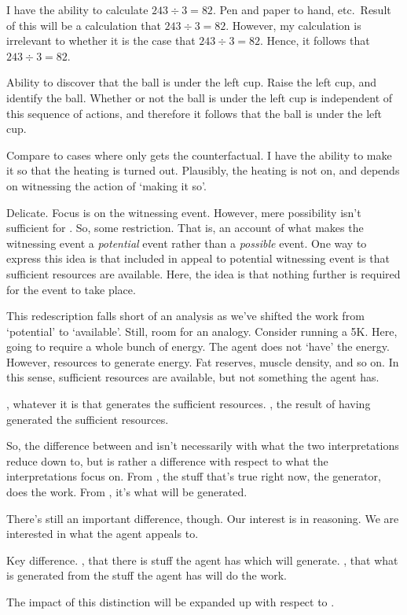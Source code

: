\begin{note}[\WR{} def.]
  \begin{illustration}
    I have the ability to calculate \(243 \div 3 = 82\).
    Pen and paper to hand, etc.\
    Result of this will be a calculation that \(243 \div 3 = 82\).
    However, my calculation is irrelevant to whether it is the case that \(243 \div 3 = 82\).
    Hence, it follows that \(243 \div 3 = 82\).
  \end{illustration}

  \begin{illustration}
    Ability to discover that the ball is under the left cup.
    Raise the left cup, and identify the ball.
    Whether or not the ball is under the left cup is independent of this sequence of actions, and therefore it follows that the ball is under the left cup.
  \end{illustration}

  Compare to cases where only gets the counterfactual.
  I have the ability to make it so that the heating is turned out.
  Plausibly, the heating is not on, and depends on witnessing the action of `making it so'.
\end{note}

\begin{note}
  Delicate.
  Focus is on the witnessing event.
  However, mere possibility isn't sufficient for .
  So, some restriction.
  That is, an account of what makes the witnessing event a \emph{potential} event rather than a \emph{possible} event.
  One way to express this idea is that included in appeal to potential witnessing event is that sufficient resources are available.
  Here, the idea is that nothing further is required for the event to take place.

  This redescription falls short of an analysis as we've shifted the work from `potential' to `available'.
  Still, room for an analogy.
  Consider running a 5K.
  Here, going to require a whole bunch of energy.
  The agent does not `have' the energy.
  However, resources to generate energy.
  Fat reserves, muscle density, and so on.
  In this sense, sufficient resources are available, but not something the agent has.

  \AR{}, whatever it is that generates the sufficient resources.
  \WR{}, the result of having generated the sufficient resources.

  So, the difference between \AR{} and \WR{} isn't necessarily with what the two interpretations reduce down to, but is rather a difference with respect to what the interpretations focus on.
  From \AR{}, the stuff that's true right now, the generator, does the work.
  From \WR{}, it's what will be generated.

  There's still an important difference, though.
  Our interest is in reasoning.
  We are interested in what the agent appeals to.

  Key difference.
  \AR{}, that there is stuff the agent has which will generate.
  \WR{}, that what is generated from the stuff the agent has will do the work.

  The impact of this distinction will be expanded up with respect to \gsi{}.
\end{note}


